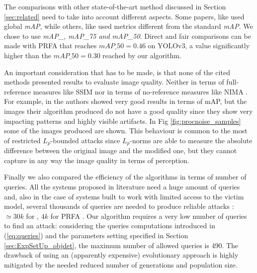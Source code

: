 The comparisons with other state-of-the-art method discussed in Section \ref{sec:related} need to take into account different aspects. Some papers, like \cite{procNoise_co2019,Lu_2020_CVPR} used global \textit{mAP}, while others,  like \cite{wang2020adversarial} used metrics different from the standard \textit{mAP}. We chose to use \textit{mAP\_, mAP\_75 and mAP\_50}.
Direct and fair comparisons can be made with PRFA\cite{liang2021parallel} that reaches   $mAP\_50=0.46$ on YOLOv3, a value significantly higher than the $mAP\_50=0.30$ reached by our algorithm. 

An important consideration that has to be made, is that none of the cited methods presented results to evaluate image quality. Neither in terms of full-reference measures like SSIM nor in terms of no-reference measures like NIMA \cite{NIMA}. For example, in \cite{procNoise_co2019} the authors showed very good results in terms of mAP, but the images their algorithm produced do not have a good quality since they show very impacting patterns and highly visible artifacts. In Fig \ref{fig:procnoise_samples} some of the images produced are shown. This behaviour is common to the most of restricted  $L_p$-bounded attacks since $L_p$-norms are able to measure the absolute difference between the original image and the modified one, but they cannot capture in any way the image quality in terms of perception.

Finally we also compared the efficiency of the algorithms in terms of number of queries. 
 All the systems proposed in literature need a huge amount of queries and, also in the case of systems built to work with limited access to the victim model, several thousands of queries are needed to produce reliable attacks : $\simeq 30k$ for \cite{wang2020adversarial}, $4k$ for PRFA \cite{liang2021parallel}.
Our algorithm requires a very low number of queries to find an attack: considering the queries computations introduced in (\ref{eq:queries}) and the parameters setting specified in Section \ref{sec:ExpSetUp_objdet}, the maximum number of allowed queries is 490. 
The drawback of using an (apparently expensive) evolutionary approach is highly mitigated by the needed reduced number of generations and population size.\\


